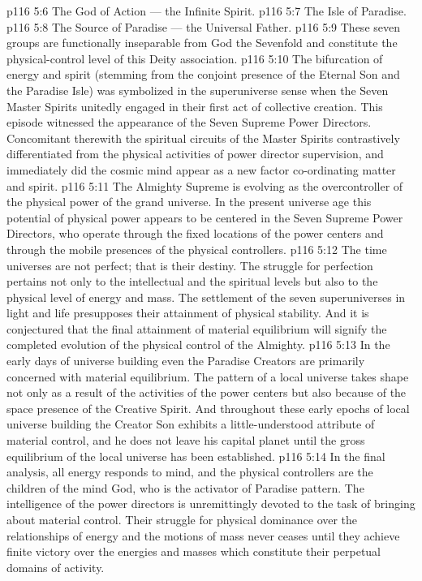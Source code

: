 \vs p116 5:6 \bibnobreakspace The God of Action --- the Infinite Spirit.
\vs p116 5:7 \bibnobreakspace The Isle of Paradise.
\vs p116 5:8 \bibnobreakspace The Source of Paradise --- the Universal Father.
\vs p116 5:9 These seven groups are functionally inseparable from God the Sevenfold and constitute the physical\hyp{}control level of this Deity association.
\vs p116 5:10 \pc The bifurcation of energy and spirit (stemming from the conjoint presence of the Eternal Son and the Paradise Isle) was symbolized in the superuniverse sense when the Seven Master Spirits unitedly engaged in their first act of collective creation. This episode witnessed the appearance of the Seven Supreme Power Directors. Concomitant therewith the spiritual circuits of the Master Spirits contrastively differentiated from the physical activities of power director supervision, and immediately did the cosmic mind appear as a new factor co\hyp{}ordinating matter and spirit.
\vs p116 5:11 The Almighty Supreme is evolving as the overcontroller of the physical power of the grand universe. In the present universe age this potential of physical power appears to be centered in the Seven Supreme Power Directors, who operate through the fixed locations of the power centers and through the mobile presences of the physical controllers.
\vs p116 5:12 \pc The time universes are not perfect; that is their destiny. The struggle for perfection pertains not only to the intellectual and the spiritual levels but also to the physical level of energy and mass. The settlement of the seven superuniverses in light and life presupposes their attainment of physical stability. And it is conjectured that the final attainment of material equilibrium will signify the completed evolution of the physical control of the Almighty.
\vs p116 5:13 In the early days of universe building even the Paradise Creators are primarily concerned with material equilibrium. The pattern of a local universe takes shape not only as a result of the activities of the power centers but also because of the space presence of the Creative Spirit. And throughout these early epochs of local universe building the Creator Son exhibits a little\hyp{}understood attribute of material control, and he does not leave his capital planet until the gross equilibrium of the local universe has been established.
\vs p116 5:14 \pc In the final analysis, all energy responds to mind, and the physical controllers are the children of the mind God, who is the activator of Paradise pattern. The intelligence of the power directors is unremittingly devoted to the task of bringing about material control. Their struggle for physical dominance over the relationships of energy and the motions of mass never ceases until they achieve finite victory over the energies and masses which constitute their perpetual domains of activity.
